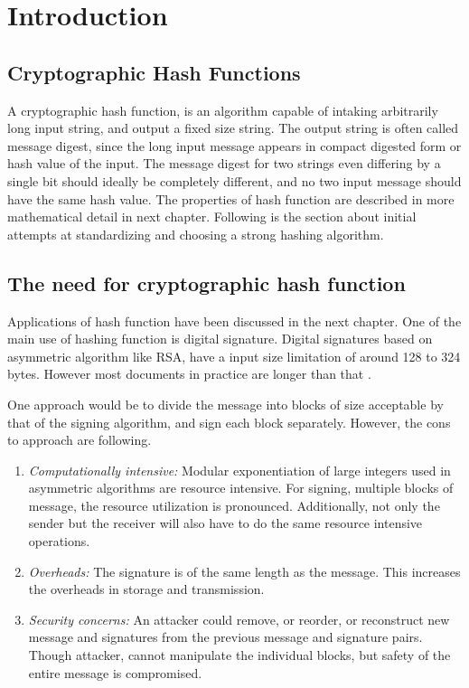 \chapter{Introduction}

\section{Cryptographic Hash Functions}

A cryptographic hash function, is an algorithm capable of intaking arbitrarily long input string, and
output a fixed size string. The output string is often called message digest, since the long input
message appears in compact digested form or hash value of the input. The message digest for two strings
even differing by a single bit should ideally be completely different, and no two input message should
have the same hash value. The properties of hash function are described in more mathematical detail in
next chapter. Following is the section about initial attempts at standardizing and choosing a strong
hashing algorithm.

\section{The need for cryptographic hash function} 

Applications of hash function have been discussed in the next chapter. One of the main
use of hashing function is digital signature. Digital signatures based on asymmetric algorithm like
RSA, have a input size limitation of around 128 to 324 bytes. However most documents in practice are
longer than that \cite{00017}.

One approach would be to divide the message into blocks of size acceptable by that of the signing 
algorithm, and sign each block separately. However, the cons to approach are following.

\begin{enumerate}
  \item \emph{Computationally intensive:} Modular exponentiation of large integers used in asymmetric
  algorithms are resource intensive. For signing, multiple blocks of message, the resource utilization
  is pronounced. Additionally, not only the sender but the receiver will also have to do the same resource
  intensive operations.
  \item \emph{Overheads:} The signature is of the same length as the message. This increases the overheads
  in storage and transmission.
  \item \emph{Security concerns:} An attacker could remove, or reorder, or reconstruct new message and 
  signatures from the previous message and signature pairs. Though attacker, cannot manipulate the individual
  blocks, but safety of the entire message is compromised.
\end{enumerate}

